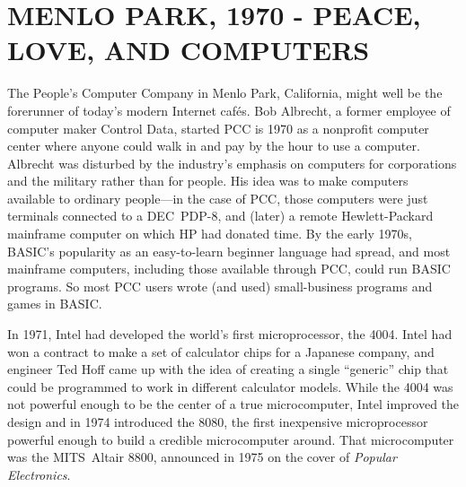 
\section{MENLO PARK, 1970 - PEACE, LOVE, AND COMPUTERS}



The People's Computer Company in Menlo Park, California, 
might well be the forerunner of today's
modern Internet caf\'{e}s.
Bob Albrecht, a former employee of computer maker Control Data, started PCC
is 1970
as a nonprofit computer center where anyone could walk in and pay
by the hour to use a computer.
Albrecht was disturbed by
the industry's emphasis on computers for corporations and
the military rather than for people.
His idea was to make computers available to ordinary people---in the
case of PCC, those computers were just
terminals connected to a DEC~PDP-8, and (later)
a remote Hewlett-Packard
mainframe computer on which HP had donated time.
By the early 1970s, BASIC's popularity as an easy-to-learn beginner
language had spread, 
and most mainframe computers, including those available through PCC, 
could run BASIC programs.
So most PCC users wrote (and used) small-business programs
and games in BASIC.


In 1971, Intel had developed the world's first microprocessor, the
4004.  Intel had won a contract to make a set of calculator chips for a
Japanese company, and engineer Ted Hoff came up with the idea of
creating a single ``generic'' chip that could be programmed to work in
different calculator models.  While the 4004 was not powerful enough to
be the center of a true microcomputer, Intel improved the design and in 
1974 introduced the 8080, the first inexpensive microprocessor powerful
enough to build a credible microcomputer around.  
That microcomputer was the MITS~Altair 8800, announced in 1975 
on the cover of \emph{Popular Electronics}.


